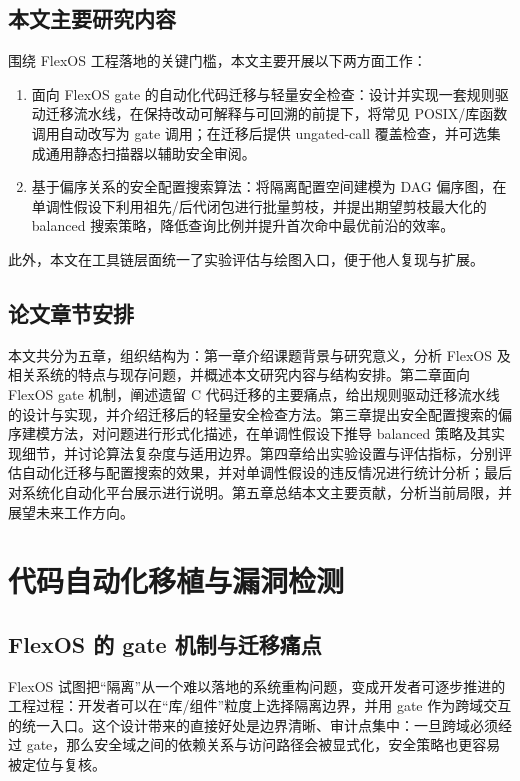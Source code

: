 \documentclass[UTF8,a4paper,12pt,twoside]{ctexart}  %
\begin{document}
\subsection{本文主要研究内容}

围绕 FlexOS 工程落地的关键门槛，本文主要开展以下两方面工作：
\begin{enumerate}
  \def\labelenumi{\arabic{enumi}.}
  \item
        面向 FlexOS gate
        的自动化代码迁移与轻量安全检查：设计并实现一套规则驱动迁移流水线，在保持改动可解释与可回溯的前提下，将常见
        POSIX/库函数调用自动改写为 gate 调用；在迁移后提供 ungated-call
        覆盖检查，并可选集成通用静态扫描器以辅助安全审阅。
  \item
        基于偏序关系的安全配置搜索算法：将隔离配置空间建模为 DAG
        偏序图，在单调性假设下利用祖先/后代闭包进行批量剪枝，并提出期望剪枝最大化的
        balanced 搜索策略，降低查询比例并提升首次命中最优前沿的效率。
\end{enumerate}

此外，本文在工具链层面统一了实验评估与绘图入口，便于他人复现与扩展。

\subsection{论文章节安排}

本文共分为五章，组织结构为：第一章介绍课题背景与研究意义，分析 FlexOS
及相关系统的特点与现存问题，并概述本文研究内容与结构安排。第二章面向
FlexOS gate 机制，阐述遗留 C
代码迁移的主要痛点，给出规则驱动迁移流水线的设计与实现，并介绍迁移后的轻量安全检查方法。第三章提出安全配置搜索的偏序建模方法，对问题进行形式化描述，在单调性假设下推导
balanced
策略及其实现细节，并讨论算法复杂度与适用边界。第四章给出实验设置与评估指标，分别评估自动化迁移与配置搜索的效果，并对单调性假设的违反情况进行统计分析；最后对系统化自动化平台展示进行说明。第五章总结本文主要贡献，分析当前局限，并展望未来工作方向。

\cleardoublepage
\section{代码自动化移植与漏洞检测}

\subsection{FlexOS 的 gate
  机制与迁移痛点}

FlexOS 试图把``隔离''从一个难以落地的系统重构问题，变成开发者可逐步推进的工程过程：开发者可以在``库/组件''粒度上选择隔离边界，并用 gate 作为跨域交互的统一入口。这个设计带来的直接好处是边界清晰、审计点集中：一旦跨域必须经过 gate，那么安全域之间的依赖关系与访问路径会被显式化，安全策略也更容易被定位与复核。
\end{document}
